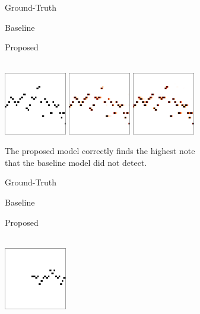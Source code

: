 \begin{figure}
\begin{subfigure}[b]{\textwidth}
	\centering
	\parbox{0.3\textwidth}{\footnotesize\centering Ground-Truth}
	\quad
	\parbox{0.3\textwidth}{\footnotesize\centering Baseline}
	\quad
	\parbox{0.3\textwidth}{\footnotesize\centering Proposed}
	\\
	\vspace{0.5em}
	\includegraphics[width=0.3\textwidth]{cropped/2191-label.png}
	\quad
	\includegraphics[width=0.3\textwidth]{cropped/2191-baseline.png}
	\quad
	\includegraphics[width=0.3\textwidth]{cropped/2191-proposed.png}
	\caption{The proposed model correctly finds the highest note that the baseline model did not detect.}
	\label{}
\end{subfigure}
\begin{subfigure}[b]{\textwidth}
	\vspace{2em}
	\centering
	\parbox{0.3\textwidth}{\footnotesize\centering Ground-Truth}
	\quad
	\parbox{0.3\textwidth}{\footnotesize\centering Baseline}
	\quad
	\parbox{0.3\textwidth}{\footnotesize\centering Proposed}
	\\
	\vspace{0.5em}
	\includegraphics[width=0.3\textwidth]{cropped/2298-label.png}

\end{subfigure}
\end{figure}
